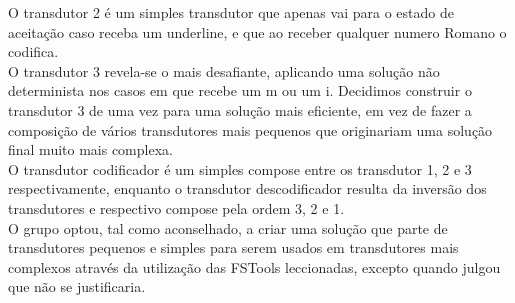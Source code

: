 \documentclass{article}
\begin{document}
O transdutor 2 é um simples transdutor que apenas vai para o estado de aceitação caso receba um underline, e que ao receber qualquer numero Romano o codifica.\\

O transdutor 3 revela-se o mais desafiante, aplicando uma solução não determinista nos casos em que recebe um m ou um i. Decidimos construir o transdutor 3 de uma vez para uma solução mais eficiente, em vez de fazer a composição de vários transdutores mais pequenos que originariam uma solução final muito mais complexa.\\

O transdutor codificador é um simples compose entre os transdutor 1, 2 e 3 respectivamente, enquanto o transdutor descodificador resulta da inversão dos transdutores e respectivo compose pela ordem 3, 2 e 1.\\

O grupo optou, tal como aconselhado, a criar uma solução que parte de transdutores pequenos e simples para serem usados em transdutores mais complexos através da utilização das FSTools leccionadas, excepto quando julgou que não se justificaria.\\
\end{document}
